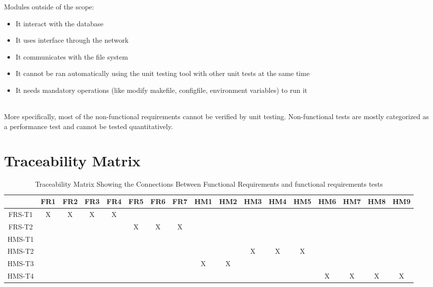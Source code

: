 \documentclass[12pt, titlepage]{article}
\begin{document}
\newline Modules outside of the scope:
\begin{itemize}
    \item It interact with the database
    \item It uses interface through the network
    \item It communicates with the file system
    \item It cannot be ran automatically using the unit testing tool with other unit tests at the same time
    \item It needs mandatory operations (like modify makefile, configfile, environment variables) to run it
\end{itemize}\\

More specifically, most of the non-functional requirements cannot be verified by unit testing. Non-functional tests are mostly categorized as a performance test and cannot be tested quantitatively.

  

\section{Traceability Matrix}

\begin{landscape}
\begin{table}[h!]
\centering
\begin{tabular}{|c|c|c|c|c|c|c|c|c|c|c|c|c|c|c|c|c|}
\hline
	& FR1 & FR2 & FR3 & FR4 & FR5 & FR6 & FR7 & HM1 & HM2 & HM3 & HM4 & HM5 & HM6 & HM7 & HM8 & HM9 \\
\hline
FRS-T1        & X& X& X& X& & & & & & & & & & & & \\ \hline
FRS-T2        & & & & & X& X& X& & & & & & & & &  \\ \hline
HMS-T1        & & & & & & & & & & & & & & & & \\ \hline
HMS-T2        & & & & & & & & & & X& X& X& & & & \\ \hline
HMS-T3        & & & & & & & & X& X& & & & & & & \\ \hline
HMS-T4        & & & & & & & & & & & & & X& X& X&X \\ \hline

\end{tabular}
\caption{Traceability Matrix Showing the Connections Between Functional Requirements and functional requirements tests}
\label{Table:A_trace}
\end{table}
\end{landscape}
\end{document}
